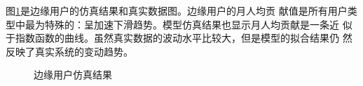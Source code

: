 图\ref{fig:simu5}是边缘用户的仿真结果和真实数据图。边缘用户的月人均贡
献值是所有用户类型中最为特殊的：呈加速下滑趋势。模型仿真结果也显示月人均贡献是一条近
似于指数函数的曲线。虽然真实数据的波动水平比较大，但是模型的拟合结果仍
然反映了真实系统的变动趋势。
\begin{figure}[!htb]
  \centering
  \caption{\small{边缘用户仿真结果}}
  \label{fig:simu5}
\end{figure}

